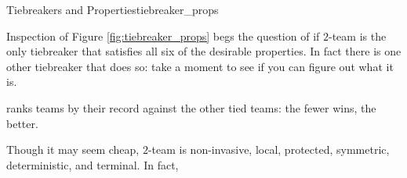 {    \begin{figg}{Tiebreakers and Properties}{tiebreaker_props}
        \begin{center}
        \end{center}
    \end{figg}

    Inspection of Figure \ref{fig:tiebreaker_props} begs the question of if $2$-team  is the only tiebreaker that satisfies all six of the desirable properties. In fact there is one other tiebreaker that does so: take a moment to see if you can figure out what it is.

    \begin{definition}{}{}
         ranks teams by their record against the other tied teams: the fewer wins, the better.
    \end{definition}

    Though it may seem cheap, $2$-team  is non-invasive, local, protected, symmetric, deterministic, and terminal. In fact,



}
